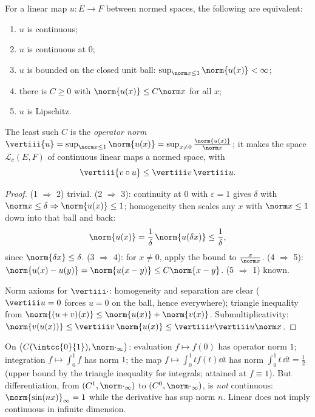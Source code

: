 \begin{theorem}[Characterization]\label{thm:b2:nvs:continuouslinear}
For a linear map $u \colon E \to F$ between normed spaces, the
following are equivalent:
\begin{enumerate}
  \item $u$ is continuous;
  \item $u$ is continuous at $0$;
  \item $u$ is bounded on the closed unit ball: $\sup_{\norm x \leq
        1} \norm{u(x)} < \infty$;
  \item there is $C \geq 0$ with $\norm{u(x)} \leq C \norm x$ for
        all $x$;
  \item $u$ is Lipschitz.
\end{enumerate}
The least such $C$ is the \emph{operator norm}
$\vertiii{u} = \sup_{\norm x \leq 1}\norm{u(x)} = \sup_{x \neq 0}
\frac{\norm{u(x)}}{\norm x}$; it makes the space $\mathcal{L}_c(E,
F)$ of continuous linear maps a normed space, with
\[
\vertiii{v \circ u} \leq \vertiii v\, \vertiii u .
\]
\end{theorem}

\begin{proof}
(1 $\Rightarrow$ 2) trivial. (2 $\Rightarrow$ 3): continuity at $0$
with $\varepsilon = 1$ gives $\delta$ with $\norm x \leq \delta
\Rightarrow \norm{u(x)} \leq 1$; homogeneity then scales any $x$
with $\norm x \leq 1$ down into that ball and back:
\[
\norm{u(x)} = \frac1\delta\,\norm{u(\delta x)} \leq
\frac1\delta ,
\]
since $\norm{\delta x} \leq \delta$. (3 $\Rightarrow$ 4):
for $x \neq 0$, apply the bound to $\frac{x}{\norm x}$. (4
$\Rightarrow$ 5): $\norm{u(x) - u(y)} = \norm{u(x - y)} \leq
C\norm{x - y}$. (5 $\Rightarrow$ 1) known.

Norm axioms for $\vertiii\cdot$: homogeneity and separation are
clear ($\vertiii u = 0$ forces $u = 0$ on the ball, hence
everywhere); triangle inequality from $\norm{(u + v)(x)} \leq
\norm{u(x)} + \norm{v(x)}$. Submultiplicativity: $\norm{v(u(x))}
\leq \vertiii v\,\norm{u(x)} \leq \vertiii v \vertiii u \norm x$.
\end{proof}

\begin{example}\label{ex:b2:nvs:operatornorms}
On $\bigl(C(\intcc{0}{1}), \norm\cdot_\infty\bigr)$: evaluation
$f \mapsto f(0)$ has operator norm $1$; integration $f \mapsto
\int_0^1 f$ has norm $1$; the map $f \mapsto \int_0^1 t f(t)\dd t$
has norm $\int_0^1 t\,\dd t = \frac12$ (upper bound by the triangle
inequality for integrals; attained at $f \equiv 1$). But
differentiation, from $(C^1, \norm\cdot_\infty)$ to $(C^0,
\norm\cdot_\infty)$, is \emph{not} continuous: $\norm{\sin(nx)}_\infty
= 1$ while the derivative has sup norm $n$. Linear does not imply
continuous in infinite dimension.
\end{example}

